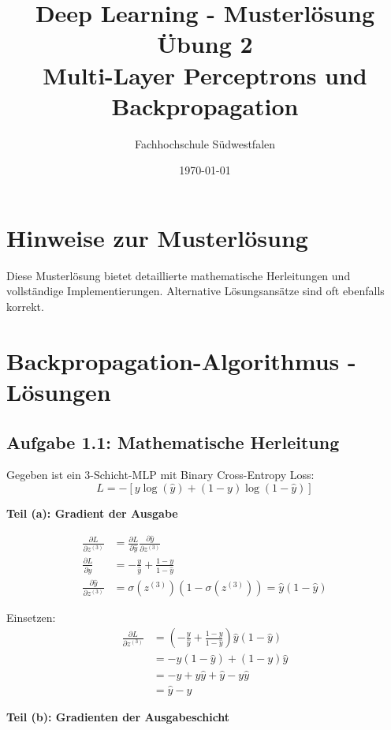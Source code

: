 ﻿\documentclass[12pt,a4paper]{article}
\title{\textbf{Deep Learning - Musterlösung Übung 2} \\ \large Multi-Layer Perceptrons und Backpropagation}
\author{Fachhochschule Südwestfalen}
\date{\today}
\begin{document}
\maketitle

\section*{Hinweise zur Musterlösung}
Diese Musterlösung bietet detaillierte mathematische Herleitungen und vollständige Implementierungen. Alternative Lösungsansätze sind oft ebenfalls korrekt.

\section{Backpropagation-Algorithmus - Lösungen}

\subsection{Aufgabe 1.1: Mathematische Herleitung}

Gegeben ist ein 3-Schicht-MLP mit Binary Cross-Entropy Loss:
\begin{equation}
L = -[y \log(\hat{y}) + (1-y) \log(1-\hat{y})]
\end{equation}

\textbf{Teil (a): Gradient der Ausgabe}

\begin{align}
\frac{\partial L}{\partial z^{(3)}} &= \frac{\partial L}{\partial \hat{y}} \frac{\partial \hat{y}}{\partial z^{(3)}} \\
\frac{\partial L}{\partial \hat{y}} &= -\frac{y}{\hat{y}} + \frac{1-y}{1-\hat{y}} \\
\frac{\partial \hat{y}}{\partial z^{(3)}} &= \sigma(z^{(3)})(1-\sigma(z^{(3)})) = \hat{y}(1-\hat{y})
\end{align}

Einsetzen:
\begin{align}
\frac{\partial L}{\partial z^{(3)}} &= \left(-\frac{y}{\hat{y}} + \frac{1-y}{1-\hat{y}}\right) \hat{y}(1-\hat{y}) \\
&= -y(1-\hat{y}) + (1-y)\hat{y} \\
&= -y + y\hat{y} + \hat{y} - y\hat{y} \\
&= \hat{y} - y
\end{align}


\textbf{Teil (b): Gradienten der Ausgabeschicht}
\end{document}
